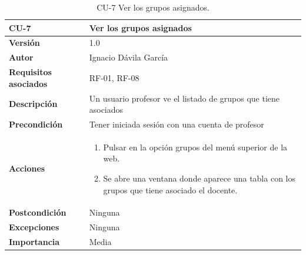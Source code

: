 \begin{table}[p]
	\centering
	\begin{tabularx}{\linewidth}{ p{} p{} }
		\toprule
		\textbf{CU-7}    & \textbf{Ver los grupos asignados}\\
		\toprule
		\textbf{Versión}              & 1.0    \\
		\textbf{Autor}                & Ignacio Dávila García \\
		\textbf{Requisitos asociados} & RF-01, RF-08 \\
		\textbf{Descripción}          & Un usuario profesor ve el listado de grupos que tiene asociados \\
		\textbf{Precondición}         & Tener iniciada sesión con una cuenta de profesor \\
		\textbf{Acciones}             &
		\begin{enumerate}
			\def\labelenumi{\arabic{enumi}.}
			\tightlist
			\item Pulsar en la opción grupos del menú superior de la web.
			\item Se abre una ventana donde aparece una tabla con los grupos que tiene asociado el docente.
		\end{enumerate}\\
		\textbf{Postcondición}        & Ninguna \\
		\textbf{Excepciones}          & Ninguna \\
		\textbf{Importancia}          & Media \\
		\bottomrule
	\end{tabularx}
	\caption{CU-7 Ver los grupos asignados.}
\end{table}

